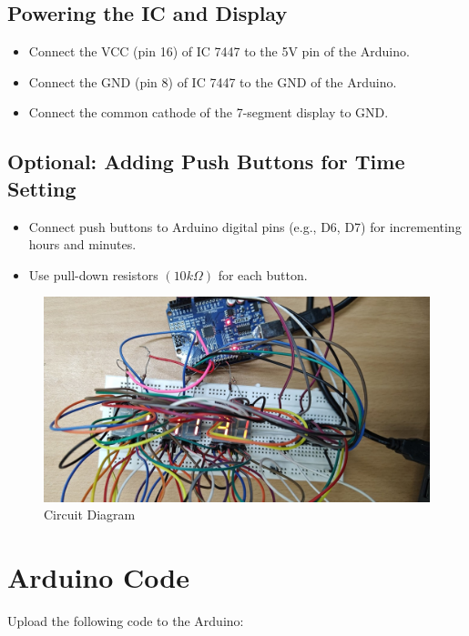 \documentclass[journal]{IEEEtran}
\numberwithin{equation}{enumi}
\numberwithin{figure}{enumi}
\begin{document}
\subsection{Powering the IC and Display}
\begin{itemize}
    \item Connect the VCC (pin 16) of IC 7447 to the 5V pin of the Arduino.
    \item Connect the GND (pin 8) of IC 7447 to the GND of the Arduino.
    \item Connect the common cathode of the 7-segment display to GND.
\end{itemize}

\subsection{Optional: Adding Push Buttons for Time Setting}
\begin{itemize}
    \item Connect push buttons to Arduino digital pins (e.g., D6, D7) for incrementing hours and minutes.
    \item Use pull-down resistors $(10k\Omega)$ for each button.
\end{itemize}

\begin{figure}[H]
    \centering
    \includegraphics[width=0.8\linewidth]{figure/fig1.png}
    \caption{Circuit Diagram}
    \label{fig:circuit}
\end{figure}

\section{Arduino Code}
Upload the following code to the Arduino:
\end{document}
